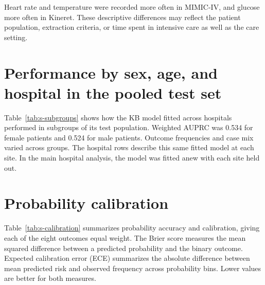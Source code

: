 ﻿\documentclass[11pt,a4paper]{article}
\begin{document}
Heart rate and temperature were recorded more often in MIMIC-IV, and glucose more often in Kineret. These descriptive differences may reflect the patient population, extraction criteria, or time spent in intensive care as well as the care setting.

\begin{table}[htbp]\centering\small\caption{Recording density by concept using a common 96-hour observation window.}\end{table}
\clearpage
\section{Performance by sex, age, and hospital in the pooled test set}
Table~\ref{tab:s-subgroups} shows how the KB model fitted across hospitals performed in subgroups of its test population. Weighted AUPRC was 0.534 for female patients and 0.524 for male patients. Outcome frequencies and case mix varied across groups. The hospital rows describe this same fitted model at each site. In the main hospital analysis, the model was fitted anew with each site held out.
\begin{table}[htbp]\centering\small
\caption{KB discrimination by subgroup. A dagger marks intervals for which fewer than 95\% of person-level bootstrap samples gave a valid estimate. A dash means that at least one outcome lacked either cases or noncases in that subgroup, so aggregate discrimination could not be calculated.}
\label{tab:s-subgroups}\resizebox{\linewidth}{!}{}\end{table}

\clearpage
\section{Probability calibration}
Table~\ref{tab:s-calibration} summarizes probability accuracy and calibration, giving each of the eight outcomes equal weight. The Brier score measures the mean squared difference between a predicted probability and the binary outcome. Expected calibration error (ECE) summarizes the absolute difference between mean predicted risk and observed frequency across probability bins. Lower values are better for both measures.
\end{document}
